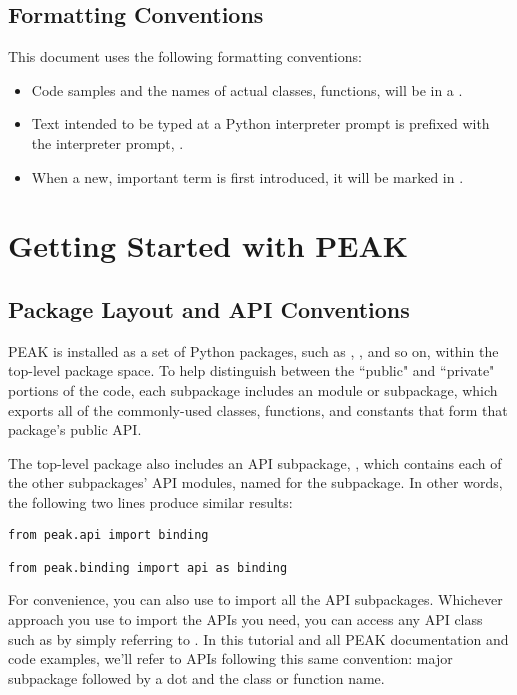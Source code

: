 \subsection{Formatting Conventions}

This document uses the following formatting conventions:

\begin{itemize}

\item Code samples and the names of actual classes, functions, will be in a
.

\item Text intended to be typed at a Python interpreter prompt is prefixed 
with the interpreter prompt, \samp{>>>}.

\item When a new, important term is first introduced, it will be marked
in .

\end{itemize}

\section{Getting Started with PEAK}

\subsection{Package Layout and API Conventions}

PEAK is installed as a set of Python packages, such as ,
, and so on, within the top-level  package
space.  To help distinguish between the ``public" and ``private" portions of
the code, each subpackage includes an  module or subpackage, which
exports all of the commonly-used classes, functions, and constants that form
that package's public API.

The top-level package also includes an API subpackage, , which
contains each of the other subpackages' API modules, named for the subpackage.
In other words, the following two lines produce similar results:

\begin{verbatim}
from peak.api import binding

from peak.binding import api as binding
\end{verbatim}

For convenience, you can also use  to import all
the API subpackages.  Whichever approach you use to import the APIs you need,
you can access any  API class such as 
by simply referring to .  In this tutorial and all PEAK
documentation and code examples, we'll refer to APIs following this same
convention: major subpackage followed by a dot and the class or function name.

